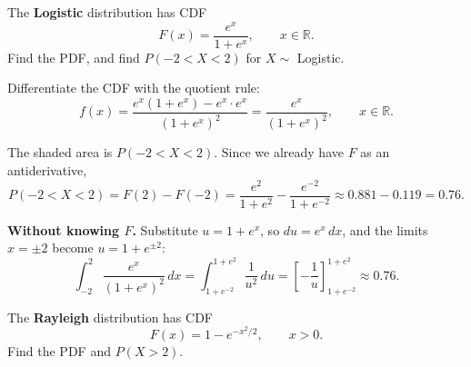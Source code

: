 \bigskip

\begin{example}\label{ex:logistic}
The \textbf{Logistic} distribution has CDF
\medskip
\[
F(x) = \frac{e^{x}}{1 + e^{x}}, \qquad x \in \mathbb{R}.
\]
\medskip
Find the PDF, and find $P(-2 < X < 2)$ for $X \sim$ Logistic.
\end{example}

\medskip

\begin{solution}
Differentiate the CDF with the quotient rule:
\medskip
\[
f(x) = \frac{e^{x}(1 + e^{x}) - e^{x} \cdot e^{x}}{(1 + e^{x})^{2}} = \frac{e^{x}}{(1 + e^{x})^{2}}, \qquad x \in \mathbb{R}.
\]
\medskip
\begin{center}
\end{center}
\medskip
The shaded area is $P(-2 < X < 2)$. Since we already have $F$ as an antiderivative,
\medskip
\[
P(-2 < X < 2) = F(2) - F(-2) = \frac{e^{2}}{1 + e^{2}} - \frac{e^{-2}}{1 + e^{-2}} \approx 0.881 - 0.119 = 0.76.
\]
\bigskip

\textbf{Without knowing $F$.} Substitute $u = 1 + e^{x}$, so $du = e^{x}\,dx$, and the limits $x = \pm 2$ become $u = 1 + e^{\pm 2}$:
\medskip
\[
\int_{-2}^{2} \frac{e^{x}}{(1 + e^{x})^{2}}\,dx
= \int_{1 + e^{-2}}^{1 + e^{2}} \frac{1}{u^{2}}\,du
= \left[-\frac{1}{u}\right]_{1 + e^{-2}}^{1 + e^{2}}
\approx 0.76.
\]
\end{solution}

\bigskip

\begin{example}\label{ex:rayleigh}
The \textbf{Rayleigh} distribution has CDF
\medskip
\[
F(x) = 1 - e^{-x^{2}/2}, \qquad x > 0.
\]
\medskip
Find the PDF and $P(X > 2)$.
\end{example}

